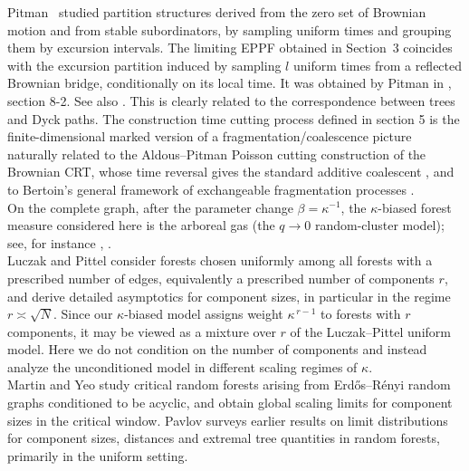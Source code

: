 \documentclass[11pt]{article}
\begin{document}
Pitman~\cite{Pitman2003PK} studied partition structures derived from the zero set of Brownian motion
and from stable subordinators, by sampling uniform times and grouping them by excursion intervals.
The limiting EPPF obtained in Section~3
coincides with the excursion partition induced by sampling $l$ uniform times
from a reflected Brownian bridge, conditionally on its local time. It was obtained by Pitman in \cite{Pitman2003PK}, section 8-2. See also \cite{Pitman2006}. This is clearly related to the correspondence between trees and Dyck paths.
The construction time cutting process defined in section 5 is the finite-dimensional marked version of a
fragmentation/coalescence picture naturally related to the
Aldous--Pitman Poisson cutting construction of the Brownian CRT, whose time
reversal gives the standard additive coalescent \cite{AldousPitman1998}, and
to Bertoin's general framework of exchangeable fragmentation processes
\cite{Bertoin2001,Bertoin2006}.\\

On the complete graph, after the parameter change \(\beta=\kappa^{-1}\),
the \(\kappa\)-biased forest measure considered here is the arboreal gas
 (the $q\to0$ random-cluster model); see,
for instance \cite{BCS}, \cite{RayXiao}.\\
 Luczak and Pittel \cite{LuczakPittel1992}
consider forests chosen uniformly among all forests with a prescribed number of edges, equivalently a prescribed number of components $r$, and derive detailed asymptotics for component sizes, in
particular in the regime $r\asymp \sqrt N$. Since our $\kappa$-biased model
assigns weight $\kappa^{\,r-1}$ to forests with $r$ components, it may be viewed
as a mixture over $r$ of the Luczak--Pittel uniform model. Here we do not
condition on the number of components and instead analyze the unconditioned
model in different scaling regimes of $\kappa$.\\
Martin and Yeo \cite{MartinYeo2018} study critical random forests arising from
Erd\H{o}s--R\'enyi random graphs conditioned to be acyclic, and obtain global
scaling limits for component sizes in the critical window. Pavlov
\cite{Pavlov2000} surveys earlier results on limit distributions for component
sizes, distances and extremal tree quantities in random forests, primarily in
the uniform setting.
\end{document}
